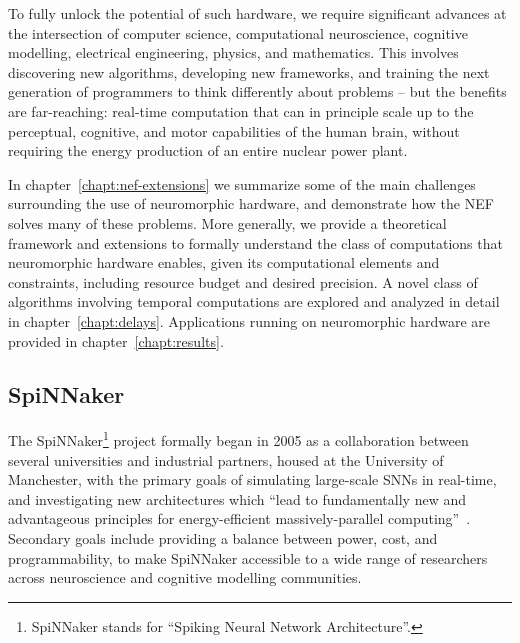 To fully unlock the potential of such hardware, we require significant advances at the intersection of computer science, computational neuroscience, cognitive modelling, electrical engineering, physics, and mathematics.
This involves discovering new algorithms, developing new frameworks, and training the next generation of programmers to think differently about problems -- but the benefits are far-reaching: real-time computation that can in principle scale up to the perceptual, cognitive, and motor capabilities of the human brain, without requiring the energy production of an entire nuclear power plant.

In chapter~\ref{chapt:nef-extensions} we summarize some of the main challenges surrounding the use of neuromorphic hardware, and demonstrate how the NEF solves many of these problems.
More generally, we provide a theoretical framework and extensions to formally understand the class of computations that neuromorphic hardware enables, given its computational elements and constraints, including resource budget and desired precision.
A novel class of algorithms involving temporal computations are explored and analyzed in detail in chapter~\ref{chapt:delays}.
Applications running on neuromorphic hardware are provided in chapter~\ref{chapt:results}.

\subsection{SpiNNaker}

The SpiNNaker\footnote{SpiNNaker stands for ``Spiking Neural Network Architecture''.} project formally began in 2005 as a collaboration between several universities and industrial partners, housed at the University of Manchester, with the primary goals of simulating large-scale SNNs in real-time, and investigating new architectures which ``lead to fundamentally new and advantageous principles for energy-efficient massively-parallel computing''~\citep{spinnakerproject, furber2014spinnaker}.
Secondary goals include providing a balance between power, cost, and programmability, to make SpiNNaker accessible to a wide range of researchers across neuroscience and cognitive modelling communities.

